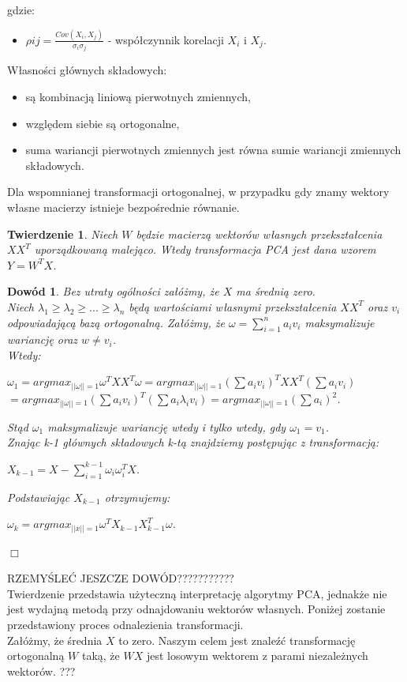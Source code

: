 \documentclass[12pt,a4paper]{report}
\newtheorem{tw}{Twierdzenie}
\newtheorem{dw}{Dowód}
\begin{document}
gdzie:
\begin{itemize}
\item $\rho{ij}=\frac{Cov(X_i,X_j)}{\sigma_{i}\sigma_{j}}$ - współczynnik korelacji $X_i$ i $X_j$.
\end{itemize}
Własności głównych składowych:
\begin{itemize}
\item są kombinacją liniową pierwotnych zmiennych,
\item względem siebie są ortogonalne,
\item suma wariancji pierwotnych zmiennych jest równa sumie wariancji zmiennych składowych.
\end{itemize}
Dla wspomnianej transformacji ortogonalnej, w przypadku gdy znamy wektory własne macierzy istnieje bezpośrednie równanie.
\begin{tw}
Niech $W$ będzie macierzą wektorów własnych przekształcenia $XX^T$ uporządkowaną malejąco.
Wtedy transformacja PCA jest dana wzorem $Y=W^T X$.
\end{tw}
\begin{dw}
Bez utraty ogólności załóżmy, że $X$ ma średnią zero.
\\Niech $\lambda_1\geq\lambda_2\geq...\geq\lambda_n$ będą wartościami własnymi przekształcenia $XX^T$ oraz $v_i$ odpowiadającą bazą ortogonalną. Załóżmy, że $\omega = \sum_{i=1}^n a_iv_i$ maksymalizuje wariancję oraz $w\neq v_i$.
\\Wtedy:
\begin{center}
$\omega_1 = argmax_{||\omega||=1}\omega^TXX^T\omega = argmax_{||\omega||=1}(\sum a_iv_i)^TXX^T(\sum a_iv_i)$
\\$ = argmax_{||\omega||=1}(\sum a_iv_i)^T(\sum a_i\lambda_iv_i)= argmax_{||\omega||=1}(\sum a_i)^2$.
\end{center}
Stąd $\omega_1$ maksymalizuje wariancję wtedy i tylko wtedy, gdy $\omega_1=v_1$. 
\\Znając k-1 głównych składowych k-tą znajdziemy postępując z transformacją:
\begin{center}
$X_{k-1} = X - \sum_{i=1}^{k-1}\omega_i\omega_i^TX$.
\end{center}
Podstawiając $X_{k-1}$ otrzymujemy:
\begin{center}
$\omega_k = argmax_{||x||=1}\omega^TX_{k-1}X_{k-1}^T\omega$.
\end{center}
\end{dw}
\begin{flushright}
$\Box$
\end{flushright}
RZEMYŚLEĆ JESZCZE DOWÓD???????????
\\Twierdzenie przedstawia użyteczną interpretację algorytmy PCA, jednakże nie jest wydajną metodą przy odnajdowaniu wektorów własnych. Poniżej zostanie przedstawiony proces odnalezienia transformacji.
\\Załóżmy, że średnia $X$ to zero. Naszym celem jest znaleźć transformację ortogonalną $W$ taką, że $WX$ jest losowym wektorem z parami niezależnych wektorów. ???
\end{document}
